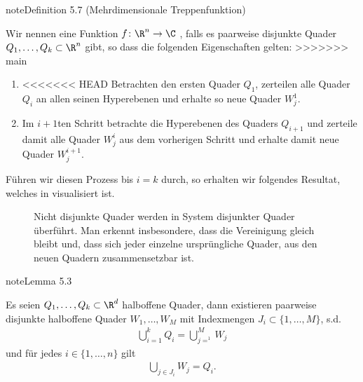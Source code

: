 \documentclass[letterpaper,10pt,english]{jupyterBook}
\let\sphinxpxdimen\pdfpxdimen\else\newdimen\sphinxpxdimen
\begin{document}
\label{masstheorie/masstheorie:definition-7}
\begin{sphinxadmonition}{note}{Definition 5.7 (Mehrdimensionale Treppenfunktion)}



\sphinxAtStartPar
Wir nennen eine Funktion \(f \colon \R^n \rightarrow \C\) , falls es paarweise disjunkte Quader \(Q_1, \ldots, Q_k \subset \R^n\) gibt, so dass die folgenden Eigenschaften gelten:
>>>>>>> main
\begin{enumerate}
%
\item {} 
\sphinxAtStartPar
<<<<<<< HEAD
Betrachten den ersten Quader \(Q_1\), zerteilen alle Quader \(Q_i\) an allen seinen Hyperebenen und erhalte so neue Quader \(W^1_j\).

\item {} 
\sphinxAtStartPar
Im \(i+1\)ten Schritt betrachte die Hyperebenen des Quaders \(Q_{i+1}\) und zerteile damit alle Quader \(W^i_j\) aus dem vorherigen Schritt und erhalte damit neue Quader \(W^{i+1}_j\).

\end{enumerate}

\sphinxAtStartPar
Führen wir diesen Prozess bis \(i=k\) durch, so erhalten wir folgendes Resultat, welches in  visualisiert ist.

\begin{figure}[htbp]
\centering
\capstart

\noindent\sphinxincludegraphics[width=400\sphinxpxdimen]{{DisRect}.jpg}
\caption{Nicht disjunkte Quader werden in System disjunkter Quader überführt. Man erkennt insbesondere, dass die Vereinigung gleich bleibt und, dass sich jeder einzelne ursprüngliche Quader, aus den neuen Quadern zusammensetzbar ist.}\label{\detokenize{masstheorie/masstheorie:fig-disrect}}\end{figure}
\label{masstheorie/masstheorie:lem:disRect}
\begin{sphinxadmonition}{note}{Lemma 5.3}



\sphinxAtStartPar
Es seien \(Q_1,\ldots,Q_k\subset\R^d\) halboffene Quader, dann existieren paarweise disjunkte halboffene Quader \(W_1,\ldots, W_M\) mit Indexmengen \(J_i\subset\{1,\ldots,M\}\), s.d.
\begin{equation*}
\begin{split}\bigcup_{i=1}^k Q_i = \bigcup_{j=^1}^M W_j\end{split}
\end{equation*}
\sphinxAtStartPar
und für jedes \(i\in\{1,\ldots,n\}\) gilt
\begin{equation*}
\begin{split}\bigcup_{j\in J_i} W_j = Q_i.\end{split}
\end{equation*}\end{sphinxadmonition}


\end{sphinxadmonition}
\end{document}
